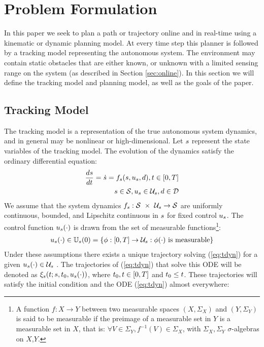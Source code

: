 \section{Problem Formulation \label{sec:formulation}}
In this paper we seek to plan a path or trajectory online and in real-time using a kinematic or dynamic planning model. At every time step this planner is followed by a tracking model representing the autonomous system. The environment may contain static obstacles that are either known, or unknown with a limited sensing range on the system (as described in Section \ref{sec:online}). In this section we will define the tracking model and planning model, as well as the goals of the paper.

\subsection{Tracking Model}
The tracking model is a representation of the true autonomous system dynamics, and in general may be nonlinear or high-dimensional. Let $s$ represent the state variables of the tracking model. The evolution of the dynamics satisfy the ordinary differential equation:
\begin{equation}
\begin{aligned}
\label{eq:tdyn}
\frac{ds}{dt} = \dot{s} = f_s(s, u_s, d), t \in [0, T] \\
s \in \mathcal{S}, u_s \in \mathcal{U}_s, d \in \mathcal{D}
\end{aligned}
\end{equation}
We assume that the system dynamics $f_s : \mathcal{S}\ \times\ \mathcal{U}_s \rightarrow \mathcal{S}$ are uniformly continuous, bounded, and Lipschitz continuous in $s$ for fixed control $u_s$. The control function $u_s(\cdot)$ is drawn from the set of measurable functions\footnote{A function $f:X\to Y$ between two measurable spaces $(X,\Sigma_X)$ and $(Y,\Sigma_Y)$ is said to be measurable if the preimage of a measurable set in $Y$ is a measurable set in $X$, that is: $\forall V\in\Sigma_Y, f^{-1}(V)\in\Sigma_X$, with $\Sigma_X,\Sigma_Y$ $\sigma$-algebras on $X$,$Y$.}:
\begin{equation}
\begin{aligned}
u_s(\cdot) \in \mathbb{U}_s(0) = \{\phi: [0, T] \rightarrow \mathcal{U}_s: \phi(\cdot) \text{ is measurable}\}
\end{aligned}
\end{equation}
Under these assumptions there exists a unique trajectory solving (\ref{eq:tdyn}) for a given $u_s(\cdot) \in \mathcal{U}_s$ \cite{Coddington84}. The trajectories of (\ref{eq:tdyn}) that solve this ODE will be denoted as $\xi_{s}(t; s, t_0, u_s(\cdot))$, where $t_0,t \in [0, T]$ and $t_0 \leq t$. These trajectories will satisfy the initial condition and the ODE (\ref{eq:tdyn}) almost everywhere:
